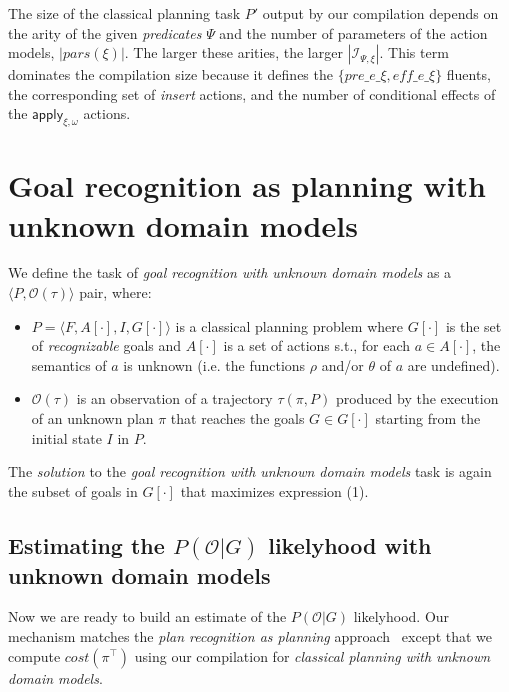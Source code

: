 \documentclass{article}
\newcommand{\tup}[1]{{\langle #1 \rangle}}
\begin{document}
The size of the classical planning task $P'$ output by our compilation depends on the arity of the given {\em predicates} $\Psi$ and the number of parameters of the action models, $|pars(\xi)|$. The larger these arities, the larger $|{\mathcal I}_{\Psi,\xi}|$. This term dominates the compilation size because it defines the $\{pre\_e\_\xi, eff\_e\_\xi\}$ fluents, the corresponding set of {\em insert} actions, and the number of conditional effects of the $\mathsf{apply_{\xi,\omega}}$ actions. 



\section{Goal recognition as planning with unknown domain models}
\label{sec:recognition}

We define the task of {\em goal recognition with unknown domain models} as a $\tup{P,\mathcal{O}(\tau)}$ pair, where:
\begin{itemize}
\item $P=\tup{F,A[\cdot],I,G[\cdot]}$ is a classical planning problem where $G[\cdot]$ is the set of {\em recognizable} goals and $A[\cdot]$ is a set of actions s.t., for each $a\in A[\cdot]$, the semantics of $a$ is unknown (i.e. the functions $\rho$ and/or $\theta$ of $a$ are undefined).
\item $\mathcal{O}(\tau)$ is an observation of a trajectory $\tau(\pi,P)$ produced by the execution of an unknown plan $\pi$ that reaches the goals $G\in G[\cdot]$ starting from the initial state $I$ in $P$.
\end{itemize}

The {\em solution} to the {\em goal recognition with unknown domain models} task is again the subset of goals in $G[\cdot]$ that maximizes expression (1). 

\subsection{Estimating the $P(\mathcal{O}|G)$ likelyhood with unknown domain models}
Now we are ready to build an estimate of the $P(\mathcal{O}|G)$ likelyhood. Our mechanism matches the {\em plan recognition as planning} approach~\cite{ramirez2012plan} except that we compute $cost(\pi^\top)$ using our compilation for {\em classical planning with unknown domain models}.
\end{document}
